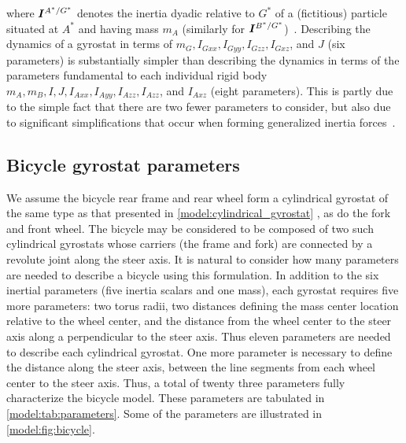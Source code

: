 where $\boldsymbol{I}^{A^*/G^*}$ denotes the inertia dyadic relative to $G^*$ of a
(fictitious) particle situated at $A^*$ and having mass $m_A$ (similarly for
$\boldsymbol{I}^{B^*/G^*}$)~\cite{Kane1985}. Describing the dynamics of a gyrostat in
terms of $m_G, I_{Gxx}, I_{Gyy}, I_{Gzz}, I_{Gxz}$, and $J$ (six parameters) is
substantially simpler than describing the dynamics in terms of the parameters
fundamental to each individual rigid body $m_A, m_B, I, J, I_{Axx}, I_{Ayy},
I_{Azz}, I_{Azz}$, and $I_{Axz}$ (eight parameters). This is partly due to the
simple fact that there are two fewer parameters to consider, but also due to
significant simplifications that occur when forming generalized inertia
forces~\cite{Mitiguy2001}.

\subsection{Bicycle gyrostat parameters} \label{model:bicycle_gyrostat_parameters}
We assume the bicycle rear frame and rear wheel form a cylindrical gyrostat of
the same type as that presented in \autoref{model:cylindrical_gyrostat} , as do
the fork and front wheel. The bicycle may be considered to be composed of two
such cylindrical gyrostats whose carriers (the frame and fork) are connected by
a revolute joint along the steer axis. It is natural to consider how many
parameters are needed to describe a bicycle using this formulation. In addition
to the six inertial parameters (five inertia scalars and one mass), each
gyrostat requires five more parameters: two torus radii, two distances defining
the mass center location relative to the wheel center, and the distance from
the wheel center to the steer axis along a perpendicular to the steer axis.
Thus eleven parameters are needed to describe each cylindrical gyrostat. One
more parameter is necessary to define the distance along the steer axis,
between the line segments from each wheel center to the steer axis. Thus, a
total of twenty three parameters fully characterize the bicycle model. These
parameters are tabulated in \autoref{model:tab:parameters}.  Some of the
parameters are illustrated in \autoref{model:fig:bicycle}.
